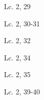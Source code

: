 \documentclass[a4paper,11pt,sans]{article}
\begin{document}
      \begin{multicols}{2}

      \columnbreak
          
      \end{multicols}
      \begin{center}
        Lc. 2, 29        
      \end{center}

      \begin{multicols}{2}

      \columnbreak
          
      \end{multicols}
      \begin{center}
        Lc. 2, 30-31         
      \end{center}
      
      \begin{multicols}{2}

      \columnbreak
          
      \end{multicols}
      \begin{center}
        Lc. 2, 32        
      \end{center}
      
      \begin{multicols}{2}

      \columnbreak
          
      \end{multicols}
      \begin{center}
        Lc. 2, 34       
      \end{center}
      
      \begin{multicols}{2}

      \columnbreak
          
      \end{multicols}
      \begin{center}
        Lc. 2, 35         
      \end{center}      
      
      \begin{multicols}{2}

      \columnbreak
          
      \end{multicols}
      \begin{center}
        Lc. 2, 39-40         
      \end{center}
            
\end{document}
